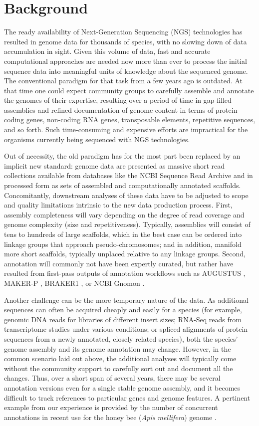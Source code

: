 \section{Background}

The ready availability of Next-Generation Sequencing (NGS) technologies has resulted in genome data for thousands of species, with no slowing down of data accumulation in sight.
Given this volume of data, fast and accurate computational approaches are needed now more than ever to process the initial sequence data into meaningful units of knowledge about the sequenced genome.
The conventional paradigm for that task from a few years ago is outdated.
At that time one could expect community groups to carefully assemble and annotate the genomes of their expertise, resulting over a period of time in gap-filled assemblies and refined documentation of genome content in terms of protein-coding genes, non-coding RNA genes, transposable elements, repetitive sequences, and so forth.
Such time-consuming and expensive efforts are impractical for the organisms currently being sequenced with NGS technologies.

Out of necessity, the old paradigm has for the most part been replaced by an implicit new standard:  genome data are presented as massive short read  collections available from databases like the NCBI Sequence Read Archive \cite{SRA} and in processed form as sets of assembled and computationally annotated scaffolds.
Concomitantly, downstream analyses of these data have to be adjusted to  scope and quality limitations intrinsic to the new data production process.
First, assembly completeness will vary depending on the degree of read coverage and genome complexity (size and repetitiveness).
Typically, assemblies will consist of tens to hundreds of large scaffolds, which in the best case can be ordered into linkage groups that approach pseudo-chromosomes; and in addition, manifold more short scaffolds, typically unplaced relative to any linkage groups.
Second, annotation will commonly not have been expertly curated, but rather have resulted from first-pass outputs of annotation workflows such as AUGUSTUS \cite{AUGUSTUS}, MAKER-P \cite{MAKERP}, BRAKER1 \cite{BRAKER1}, or NCBI Gnomon \cite{Gnomon}.

Another challenge can be the more temporary nature of the data.
As additional sequences can often be acquired cheaply and easily for a species (for example, genomic DNA reads for libraries of different insert sizes; RNA-Seq reads from transcriptome studies under various conditions; or spliced alignments of protein sequences from a newly annotated, closely related species), both the species' genome assembly and its genome annotation may change.
However, in the common scenario laid out above, the additional analyses will typically come without the community support to carefully sort out and document all the changes.
Thus, over a short span of several years, there may be several annotation versions even for a single stable genome assembly, and it becomes difficult to track references to particular genes and genome features.
A pertinent example from our experience is provided by the number of concurrent annotations in recent use for the honey bee (\textit{Apis mellifera}) genome \cite{OGS1.0, OGS3.2, NCBIAm102}.


